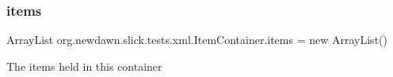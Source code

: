 \subsubsection{\texorpdfstring{items}{items}}
{\footnotesize\ttfamily Array\+List org.\+newdawn.\+slick.\+tests.\+xml.\+Item\+Container.\+items = new Array\+List()\hspace{0.3cm}{\ttfamily [private]}}

The items held in this container 